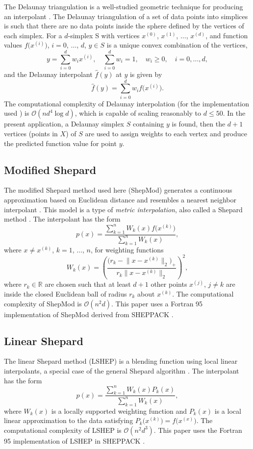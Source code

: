 \documentclass[smallextended,final]{svjour3}       %
\begin{document}
The Delaunay triangulation is a well-studied geometric technique for
producing an interpolant \cite{lee1980two}. The Delaunay triangulation
of a set of data points into simplices is such that there are no data
points inside the sphere defined by the vertices of each simplex. For
a $d$-simplex S with vertices $x^{(0)}$, $x^{(1)}$, $\ldots$,
$x^{(d)}$, and function values $f\bigl(x^{(i)}\bigr)$, $i=0$,
$\ldots$, $d$, $y \in S$ is a unique convex combination of the
vertices,
$$ y = \sum_{i=0}^{d} w_i x^{(i)}, \quad \sum_{i=0}^{d} w_i = 1, \quad w_i \geq 0, \quad i=0,\ldots,d, $$
and the Delaunay interpolant $\hat f(y)$ at $y$ is given by
$$ \hat f(y) = \sum_{i=0}^{d} w_i f\bigl(x^{(i)}\bigr). $$
The computational complexity of Delaunay interpolation (for the
implementation used \cite{chang2018polynomial}) is $\mathcal{O}(n d^4
\log d)$, which is capable of scaling reasonably to $d \leq 50$. In
the present application, a Delaunay simplex $S$ containing $y$ is
found, then the $d+1$ vertices (points in $X$) of $S$ are used to
assign weights to each vertex and produce the predicted function value
for point $y$.

\subsection{Modified Shepard}
\label{sec:modified-shepard}

The modified Shepard method used here (ShepMod) generates a continuous
approximation based on Euclidean distance and resembles a nearest
neighbor interpolant \cite{cover1967nearest}. This model is a type of
\textit{metric interpolation}, also called a Shepard method
\cite{shepard1968two,gordon1978shepard}. The interpolant has the form
$$ p(x) = \frac{\sum\limits_{k=1}^{n}W_k(x)f\bigl(x^{(k)}\bigr)}{\sum\limits_{k=1}^{n}W_k(x)},$$
where $x \not = x^{(k)}$, $k = 1$, $\ldots$, $n$, for weighting functions
$$W_k(x) = \left( \frac{\big(r_k - \bigl\|x - x^{(k)}\bigr\|_2\big)_+}{r_k \bigl\|x - x^{(k)}\bigr\|_2} \right)^2,$$ 
where $r_k \in \mathbb{R}$ are chosen such that at least $d+1$ other
points $x^{(j)}$, $j \not = k$ are inside the closed Euclidean ball of
radius $r_k$ about $x^{(k)}$. The computational complexity of ShepMod
is $\mathcal{O}(n^2d)$. This paper uses a Fortran 95 implementation of
ShepMod derived from SHEPPACK \cite{thacker2010algorithm}.

\subsection{Linear Shepard}
The linear Shepard method (LSHEP) is a blending function using local
linear interpolants, a special case of the general Shepard algorithm
\cite{thacker2010algorithm}. The interpolant has the form
$$ p(x) = \frac{\sum\limits_{k=1}^{n}W_k(x)P_k(x)}{\sum\limits_{k=1}^{n}W_k(x)} ,$$
where $W_k(x)$ is a locally supported weighting function and $P_k(x)$
is a local linear approximation to the data satisfying
$P_k\bigl(x^{(k)}\bigr) = f\bigl(x^{(x)}\bigr)$. The computational
complexity of LSHEP is $\mathcal{O}(n^2d^3)$. This paper uses the
Fortran 95 implementation of LSHEP in SHEPPACK
\cite{thacker2010algorithm}.
\end{document}
